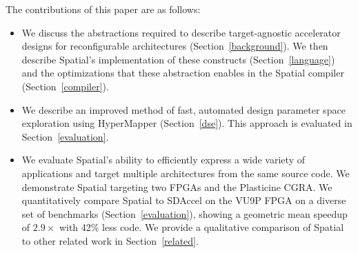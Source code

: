 The contributions of this paper are as follows:
\vspace{-5pt}
\begin{itemize}
  \item We discuss the abstractions required to describe target-agnostic accelerator designs for reconfigurable architectures (Section~\ref{background}). We then describe Spatial's implementation of these constructs (Section~\ref{language}) and the optimizations that these abstraction enables in the Spatial compiler (Section~\ref{compiler}).

  \vspace{5pt}

  \item We describe an improved method of fast, automated design parameter space exploration using HyperMapper (Section~\ref{dse}). This approach is evaluated in Section~\ref{evaluation}.

  \vspace{5pt}

  \item We evaluate Spatial's ability to efficiently express a wide variety of applications and
    target multiple architectures from the same source code. We demonstrate Spatial targeting two FPGAs and the Plasticine CGRA. 
    We quantitatively compare Spatial to SDAccel on the VU9P FPGA on a diverse set of benchmarks (Section~\ref{evaluation}), showing a geometric mean speedup of $2.9\times$ with 42\% less code.
    We provide a qualitative comparison of Spatial to other related work in Section~\ref{related}.
\end{itemize}